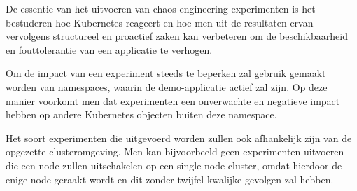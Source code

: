 De essentie van het uitvoeren van chaos engineering experimenten is het bestuderen hoe Kubernetes reageert en hoe men uit de resultaten ervan vervolgens structureel en proactief zaken kan verbeteren om de beschikbaarheid en fouttolerantie van een applicatie te verhogen.  

Om de impact van een experiment steeds te beperken zal gebruik gemaakt worden van namespaces, waarin de demo-applicatie actief zal zijn. Op deze manier voorkomt men dat experimenten een onverwachte en negatieve impact hebben op andere Kubernetes objecten buiten deze namespace.

Het soort experimenten die uitgevoerd worden zullen ook afhankelijk zijn van de opgezette clusteromgeving. Men kan bijvoorbeeld geen experimenten uitvoeren die een node zullen uitschakelen op een single-node cluster, omdat hierdoor de enige node geraakt wordt en dit zonder twijfel kwalijke gevolgen zal hebben.    
